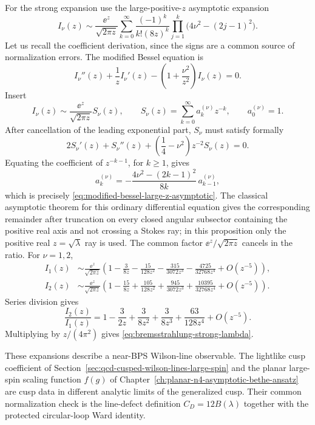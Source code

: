 For the strong expansion use the large-positive-\(z\) asymptotic expansion
\begin{equation}
  I_\nu(z)
  \sim
  \frac{\ee^z}{\sqrt{2\pi z}}
  \sum_{k=0}^{\infty}
  \frac{(-1)^k}{k!(8z)^k}
  \prod_{j=1}^{k}\bigl(4\nu^2-(2j-1)^2\bigr).
  \label{eq:modified-bessel-large-z-asymptotic}
\end{equation}
Let us recall the coefficient derivation, since the signs are a common
source of normalization errors.  The modified Bessel equation is
\[
  I_\nu''(z)+\frac1z I_\nu'(z)
  -\left(1+\frac{\nu^2}{z^2}\right)I_\nu(z)=0 .
\]
Insert
\[
  I_\nu(z)\sim \frac{\ee^z}{\sqrt{2\pi z}}
  S_\nu(z),\qquad
  S_\nu(z)=\sum_{k=0}^{\infty}a_k^{(\nu)}z^{-k},
  \qquad a_0^{(\nu)}=1 .
\]
After cancellation of the leading exponential part, \(S_\nu\) must satisfy
formally
\[
  2S_\nu'(z)+S_\nu''(z)
  +\left(\frac14-\nu^2\right)z^{-2}S_\nu(z)=0 .
\]
Equating the coefficient of \(z^{-k-1}\), for \(k\geq 1\), gives
\[
  a_k^{(\nu)}
  =
  -\frac{4\nu^2-(2k-1)^2}{8k}\,
  a_{k-1}^{(\nu)} ,
\]
which is precisely \eqref{eq:modified-bessel-large-z-asymptotic}.  The
classical asymptotic theorem for this ordinary differential equation gives
the corresponding remainder after truncation on every closed angular
subsector containing the positive real axis and not crossing a Stokes ray; in
this proposition only the positive real \(z=\sqrt\lambda\) ray is used.
The common factor \(\ee^z/\sqrt{2\pi z}\) cancels in the ratio.  For
\(\nu=1,2\),
\[
\begin{aligned}
  I_1(z)&\sim
  \frac{\ee^z}{\sqrt{2\pi z}}
  \left(
  1-\frac{3}{8z}-\frac{15}{128z^2}
  -\frac{315}{3072z^3}-\frac{4725}{32768z^4}
  +O(z^{-5})
  \right),\\
  I_2(z)&\sim
  \frac{\ee^z}{\sqrt{2\pi z}}
  \left(
  1-\frac{15}{8z}+\frac{105}{128z^2}
  +\frac{945}{3072z^3}+\frac{10395}{32768z^4}
  +O(z^{-5})
  \right).
\end{aligned}
\]
Series division gives
\[
  \frac{I_2(z)}{I_1(z)}
  =
  1-\frac{3}{2z}+\frac{3}{8z^2}
  +\frac{3}{8z^3}+\frac{63}{128z^4}
  +O(z^{-5}).
\]
Multiplying by \(z/(4\pi^2)\) gives
\eqref{eq:bremsstrahlung-strong-lambda}.

These expansions describe a near-BPS Wilson-line observable.  The lightlike
cusp coefficient of Section~\ref{sec:qcd-cusped-wilson-lines-large-spin} and
the planar large-spin scaling function \(f(g)\) of
Chapter~\ref{ch:planar-n4-asymptotic-bethe-ansatz} are cusp data in different
analytic limits of the generalized cusp.  Their common normalization check is
the line-defect definition \(C_D=12B(\lambda)\) together with the protected
circular-loop Ward identity.

